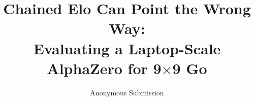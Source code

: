 \documentclass[letterpaper]{article} %
\title{Chained Elo Can Point the Wrong Way:\\Evaluating a Laptop-Scale AlphaZero for 9$\times$9 Go}
\author{
    Anonymous Submission
}
\begin{document}
\maketitle









\label{pw:mainend}


\end{document}
